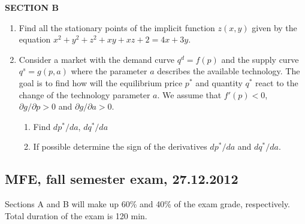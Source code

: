 \documentclass[pdftex,12pt,a4paper]{article}
\begin{document}
\vspace{20pt}
\textbf{SECTION B}
\vspace{20pt}

\begin{enumerate}[resume]
\item Find all the stationary points of the implicit function $z(x,y)$ given  by the equation $x^2+y^2+z^2+xy+xz+2=4x+3y$. 

\item Consider a market with the demand curve $q^d=f(p)$ and the supply curve $q^s=g(p,a)$ where the parameter $a$ describes the available technology. The goal is to find how will the equilibrium price $p^*$ and quantity $q^*$ react to the change of the technology parameter $a$. We assume that  $f'(p)<0$, $\partial g/\partial p>0$ and $\partial g/\partial a>0$.
\begin{enumerate}
\item Find $dp^*/da$, $dq^*/da$
\item If possible determine the sign of the derivatives $dp^*/da$ and $dq^*/da$. 
\end{enumerate}

\end{enumerate}


\subsection{MFE, fall semester exam, 27.12.2012} 

Sections A and B will make up 60\% and 40\% of the exam grade, respectively. Total duration of the exam is 120 min. 
\end{document}
